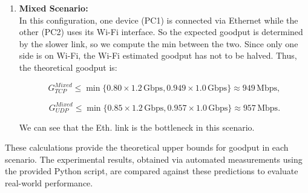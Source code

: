 \begin{enumerate}
            \vspace{0.1cm} %

            \item \textbf{Mixed Scenario:} \\
            In this configuration, one device (PC1) is connected via Ethernet while the other (PC2) uses its Wi-Fi interface. 
            So the expected goodput is determined by the slower link, so we compute the min between the two.
            Since only one side is on Wi-Fi, the Wi-Fi estimated goodput has not to be halved.
            Thus, the theoretical goodput is:

            \vspace{-0.1cm} %

            \[
            G_{TCP}^{Mixed} \leq \min \{0.80 \times 1.2\,\text{Gbps}, 0.949 \times 1.0\,\text{Gbps}\} \approx 949\,\text{Mbps},
            \]

            \vspace{-0.2cm} %

            \[
            G_{UDP}^{Mixed} \leq \min \{0.85 \times 1.2\,\text{Gbps}, 0.957 \times 1.0\,\text{Gbps}\} \approx 957\,\text{Mbps}.
            \]

            \vspace{0.1cm} %

            We can see that the Eth. link is the bottleneck in this scenario.

        \end{enumerate}

        \vspace{0.1cm} %

        \noindent These calculations provide the theoretical upper bounds for goodput in each scenario. 
        The experimental results, obtained via automated measurements using the provided Python script, are compared against these predictions to evaluate real-world performance.

